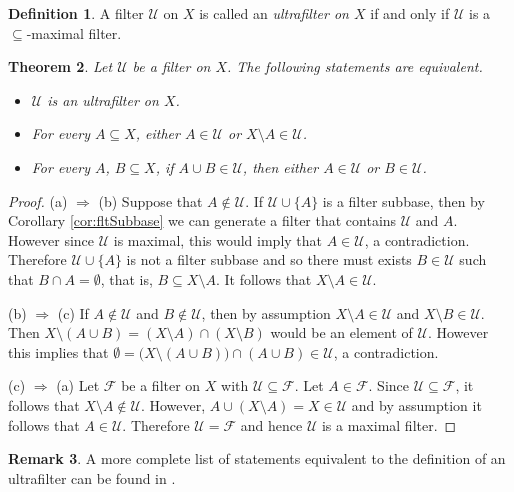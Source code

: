 \documentclass[12pt]{article}
\theoremstyle{plain}
\newtheorem{thm}{Theorem}[section]
\theoremstyle{definition}
\newtheorem{defn}[thm]{Definition}
\newtheorem{rmk}[thm]{Remark}
\newcommand{\calF}{\mathcal{F}}
\newcommand{\calU}{\mathcal{U}}
\begin{document}
\begin{defn}
  A filter $\calU$ on $X$ is called an \textsl{ultrafilter on $X$} if and only if $\calU$ is a \mbox{$\subseteq$-maximal} filter.
\end{defn}

\begin{thm}
  \label{thm:equivUf}
  Let $\calU$ be a filter on $X$.
  The following statements are equivalent.
  \begin{itemize}
    \item[(a)] $\calU$ is an ultrafilter on $X$.
    \item[(b)] For every $A \subseteq X$, either $A \in \calU$ or $X \setminus A \in \calU$.
    \item[(c)] For every $A$, $B \subseteq X$, if $A \cup B \in \calU$, then either $A \in \calU$ or $B \in \calU$.
  \end{itemize}
\end{thm}
\begin{proof}
  (a) $\Rightarrow$ (b)
  Suppose that $A \not\in \calU$.
  If $\calU \cup \{A\}$ is a filter subbase, then by Corollary
  \ref{cor:fltSubbase} we can generate a filter that contains $\calU$
  and $A$.
  However since $\calU$ is maximal, this would imply that $A \in
  \calU$, a contradiction.
  Therefore $\calU \cup \{A\}$ is not a filter subbase and so there
  must exists $B \in \calU$ such that $B \cap A = \emptyset$, that is,
  $B \subseteq X \setminus A$.
  It follows that $X \setminus A \in \calU$.
  
  (b) $\Rightarrow$ (c)
  If $A \not\in \calU$ and $B \not\in \calU$, then by assumption $X
  \setminus A \in \calU$ and $X \setminus B \in \calU$.
  Then $X \setminus (A \cup B) = (X \setminus A) \cap (X \setminus B)$
  would be an element of $\calU$.
  However this implies that $\emptyset = \bigl(X \setminus (A \cup
  B)\bigr) \cap (A \cup B) \in \calU$, a contradiction.

  (c) $\Rightarrow$ (a)
  Let $\calF$ be a filter on $X$ with $\calU \subseteq \calF$.
  Let $A \in \calF$.
  Since $\calU \subseteq \calF$, it follows that $X \setminus A
  \not\in \calU$.
  However, $A \cup (X \setminus A) = X \in \calU$ and by assumption it
  follows that $A \in \calU$.
  Therefore $\calU = \calF$ and hence $\calU$ is a maximal filter.
\end{proof}
\begin{rmk}
  A more complete list of statements equivalent to the definition of an ultrafilter can be found in \cite[Theorem 3.6]{Hindman:1998fk}.
\end{rmk}
\end{document}

